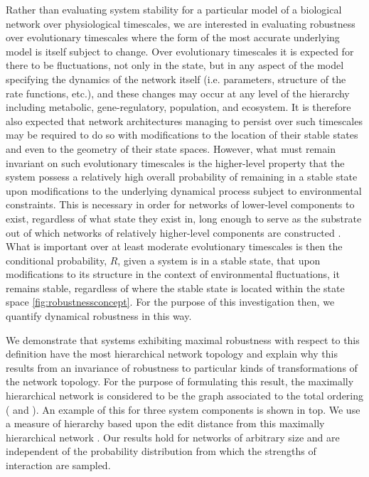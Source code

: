 Rather than evaluating system stability for a particular model of a biological network over physiological timescales, we are interested in evaluating robustness over evolutionary timescales where the form of the most accurate underlying model is itself subject to change. Over evolutionary timescales it is expected for there to be fluctuations, not only in the state, but in any aspect of the model specifying the dynamics of the network itself (i.e. parameters, structure of the rate functions, etc.), and these changes may occur at any level of the hierarchy including metabolic, gene-regulatory, population, and ecosystem. It is therefore also expected that network architectures managing to persist over such timescales may be required to do so with modifications to the location of their stable states and even to the geometry of their state spaces. However, what must remain invariant on such evolutionary timescales is the higher-level property that the system possess a relatively high overall probability of remaining in a stable state upon modifications to the underlying dynamical process subject to environmental constraints. This is necessary in order for networks of lower-level components to exist, regardless of what state they exist in, long enough to serve as the substrate out of which networks of relatively higher-level components are constructed \cite{Simon2002}. What is important over at least moderate evolutionary timescales is then the conditional probability, $R$, given a system is in a stable state, that upon modifications to its structure in the context of environmental fluctuations, it remains stable, regardless of where the stable state is located within the state space \ref{fig:robustnessconcept}. For the purpose of this investigation then, we quantify dynamical robustness in this way.

We demonstrate that systems exhibiting maximal robustness with respect to this definition have the most hierarchical network topology and explain why this results from an invariance of robustness to particular kinds of transformations of the network topology. For the purpose of formulating this result, the maximally hierarchical network is considered to be the graph associated to the total ordering ( and \cite{Cormen2009}). An example of this for three system components is shown in  top. We use a measure of hierarchy based upon the edit distance from this maximally hierarchical network \cite{Axenovich2011}. Our results hold for networks of arbitrary size and are independent of the probability distribution from which the strengths of interaction are sampled.
